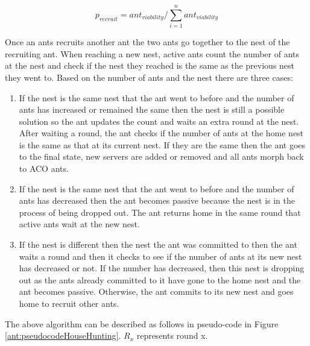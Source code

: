 \documentclass[conference]{IEEEtran}
\begin{document}
\begin{equation}
p_{recruit} = ant_{viability} / \sum\limits_{i=1}^n ant_{viability}
\end{equation}

Once an ants recruits another ant the two ants go together to the nest of the recruiting ant. When reaching a new nest, active ants count the number of ants at the nest and check if the nest they reached is the same as the previous nest they went to. Based on the number of ants and the nest there are three cases:

\begin{enumerate}
	\item If the nest is the same nest that the ant went to before and the number of ants has increased or remained the same then the nest is still a possible solution so the ant updates the count and waits an extra round at the nest. After waiting a round, the ant checks if the number of ants at the home nest is the same as that at its current nest. If they are the same then the ant goes to the final state, new servers are added or removed and all ants morph back to ACO ants.
	\item If the nest is the same nest that the ant went to before and the number of ants has decreased then the ant becomes passive because the nest is in the process of being dropped out. The ant returns home in the same round that active ants wait at the new nest.
	\item If the nest is different then the nest the ant was committed to then the ant waits a round and then it checks to see if the number of ants at its new nest has decreased or not. If the number has decreased, then this nest is dropping out as the ants already committed to it have gone to the home nest and the ant becomes passive. Otherwise, the ant commits to its new nest and goes home to recruit other ants.
\end{enumerate}

The above algorithm can be described as follows in pseudo-code in Figure \ref{ant:pseudocodeHouseHunting}. $R_{x}$ represents round x.
\end{document}
